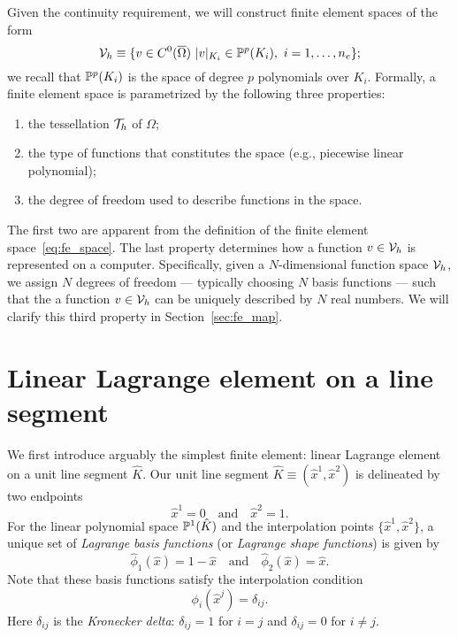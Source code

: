 Given the continuity requirement, we will construct finite element spaces of the form
\begin{equation}
  \mathcal{V}_h \equiv \{ v \in C^0(\overline \Omega) \ | v |_{K_i} \in \mathbb{P}^p(K_i), \ i = 1,\dots, n_e \};
  \label{eq:fe_space}
\end{equation}
we recall that $\mathbb{P}^p(K_i)$ is the space of degree $p$ polynomials over $K_i$. Formally, a finite element space is parametrized by the following three properties:
\begin{enumerate}
\item the tessellation $\mathcal{T}_h$ of $\Omega$;
\item the type of functions that constitutes the space (e.g., piecewise linear polynomial);
\item the degree of freedom used to describe functions in the space.
\end{enumerate}
The first two are apparent from the definition of the finite element space~\eqref{eq:fe_space}.  The last property determines how a function $v \in \mathcal{V}_h$ is represented on a computer.  Specifically, given a $N$-dimensional function space $\mathcal{V}_h$, we assign $N$ degrees of freedom --- typically choosing $N$ basis functions --- such that the a function $v \in \mathcal{V}_h$ can be uniquely described by $N$ real numbers.  We will clarify this third property in Section~\ref{sec:fe_map}.


\section{Linear Lagrange element on a line segment}
\label{sec:fe_lin_line}
We first introduce arguably the simplest finite element: linear Lagrange element on a unit line segment $\hat K$.  Our unit line segment $\hat K \equiv (\hat x^1, \hat x^2)$ is delineated by two endpoints
\begin{equation*}
  \hat x^1 = 0 \quad \text{and} \quad \hat x^2 = 1.
\end{equation*}
For the linear polynomial space $\mathbb{P}^1(\hat K)$ and the interpolation points $\{\hat x^1, \hat x^2\}$, a unique set of \emph{Lagrange basis functions} (or \emph{Lagrange shape functions}) is given by
\begin{equation*}
  \hat \phi_1(\hat x) = 1 - \hat x \quad \text{and} \quad \hat \phi_2(\hat x) = \hat x.
\end{equation*}
Note that these basis functions satisfy the interpolation condition
\begin{equation*}
  \phi_i(\hat x^j) = \delta_{ij}.
\end{equation*}
Here $\delta_{ij}$ is the \emph{Kronecker delta}: $\delta_{ij} = 1$ for $i = j$ and $\delta_{ij} = 0$ for $i \neq j$.

